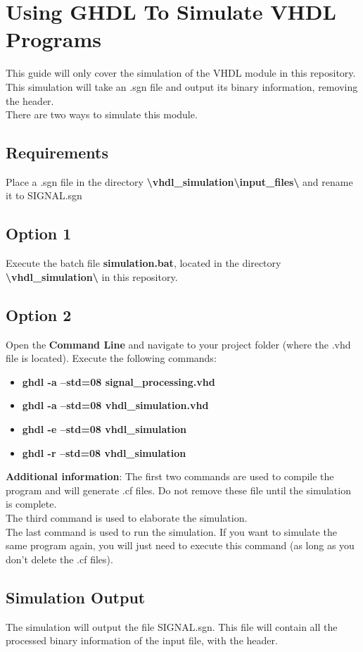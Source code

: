 \section{Using GHDL To Simulate VHDL Programs}
This guide will only cover the simulation of the VHDL module in this repository.\\
This simulation will take an .sgn file and output its binary information, removing the header.\\
There are two ways to simulate this module.
\subsection{Requirements}
Place a .sgn file in the directory \textbf{\textbackslash{}vhdl\_simulation\textbackslash{}input\_files\textbackslash{}} and rename it to SIGNAL.sgn

\subsection{Option 1}
Execute the batch file \textbf{simulation.bat}, located in the directory \textbf{\textbackslash{}vhdl\_simulation\textbackslash{}} in this repository.

\subsection{Option 2}
Open the \textbf{Command Line} and navigate to your project folder (where the .vhd file is located).
Execute the following commands:
\begin{itemize}
  \item[] \textbf{ghdl -a --std=08 signal\_processing.vhd}
  \item[] \textbf{ghdl -a --std=08 vhdl\_simulation.vhd}
  \item[] \textbf{ghdl -e --std=08 vhdl\_simulation}
  \item[] \textbf{ghdl -r --std=08 vhdl\_simulation}
\end{itemize}
\textbf{Additional information}: The first two commands are used to compile the program and will generate .cf files. Do not remove these file until the simulation is complete.\\
The third command is used to elaborate the simulation.\\
The last command is used to run the simulation. If you want to simulate the same program again, you will just need to execute this command (as long as you don't delete the .cf files).

\subsection{Simulation Output}
The simulation will output the file SIGNAL.sgn. This file will contain all the processed binary information of the input file, with the header.